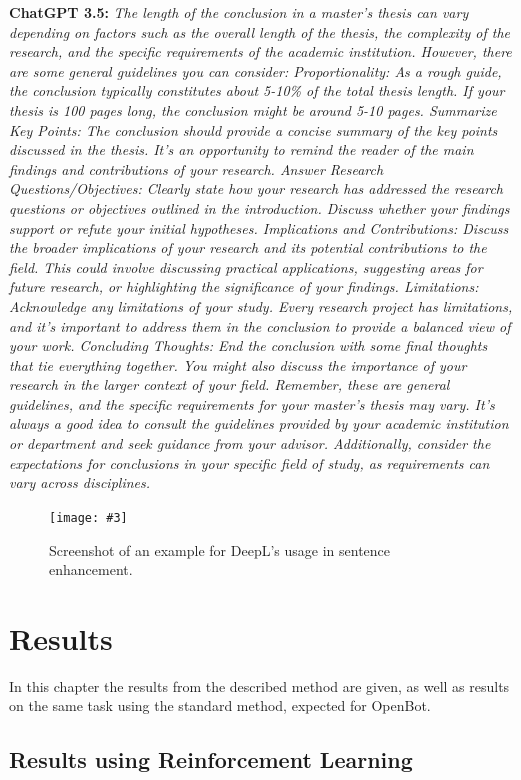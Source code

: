 \documentclass[12pt]{report}
\newcommand\insertfigure[5]{
\begin{figure}[#1]
\begin{center}
\texttt{[image: \#3]}
\end{center}
\caption{#4}
\label{#5}
\end{figure}
}
\begin{document}
\textbf{ChatGPT 3.5: } \textit{The length of the conclusion in a master's thesis can vary depending on factors such as the overall length of the thesis, the complexity of the research, and the specific requirements of the academic institution. However, there are some general guidelines you can consider:
Proportionality: As a rough guide, the conclusion typically constitutes about 5-10\% of the total thesis length. If your thesis is 100 pages long, the conclusion might be around 5-10 pages.
Summarize Key Points: The conclusion should provide a concise summary of the key points discussed in the thesis. It's an opportunity to remind the reader of the main findings and contributions of your research.
Answer Research Questions/Objectives: Clearly state how your research has addressed the research questions or objectives outlined in the introduction. Discuss whether your findings support or refute your initial hypotheses.
Implications and Contributions: Discuss the broader implications of your research and its potential contributions to the field. This could involve discussing practical applications, suggesting areas for future research, or highlighting the significance of your findings.
Limitations: Acknowledge any limitations of your study. Every research project has limitations, and it's important to address them in the conclusion to provide a balanced view of your work.
Concluding Thoughts: End the conclusion with some final thoughts that tie everything together. You might also discuss the importance of your research in the larger context of your field.
Remember, these are general guidelines, and the specific requirements for your master's thesis may vary. It's always a good idea to consult the guidelines provided by your academic institution or department and seek guidance from your advisor. Additionally, consider the expectations for conclusions in your specific field of study, as requirements can vary across disciplines.}


\insertfigure{th}{1\textwidth}{DeepL.png}{Screenshot of an example for DeepL's usage in sentence enhancement.}{fig:deepl}
\chapter{Results}
\label{sub:Results}
In this chapter the results from the described method are given,  as well as results on the same task using the standard method, expected for OpenBot.
\section{Results using Reinforcement Learning}
\label{sub:results_rl}
\end{document}
